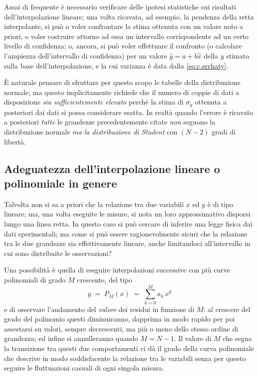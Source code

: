Assai di frequente \`e necessario verificare delle ipotesi
statistiche sui risultati dell'interpolazione lineare; una
volta ricavata, ad esempio, la pendenza della retta
interpolante, si pu\`o o voler confrontare la stima ottenuta
con un valore noto a priori, o voler costruire attorno ad
essa un intervallo corrispondente ad un certo livello di
confidenza; o, ancora, si pu\`o voler effettuare il
confronto (o calcolare l'ampiezza dell'intervallo di
confidenza) per un valore $\widehat y = a + b \widehat x$
della $y$ stimato sulla base dell'interpolazione, e la cui
varianza \`e data dalla \eqref{eq:c.errhaty}.

\`E naturale pensare di sfruttare per questo scopo le
tabelle della distribuzione normale; ma questo
implicitamente richiede che il numero di coppie di dati a
disposizione \emph{sia sufficientemente elevato} perch\'e la
stima di $\sigma_y$ ottenuta a posteriori dai dati si possa
considerare esatta.  In realt\`a quando l'errore \`e
ricavato a posteriori \emph{tutte} le grandezze
precedentemente citate \emph{non} seguono la distribuzione
normale \emph{ma la distribuzione di Student}%
con $(N-2)$ gradi di libert\`a.

\subsection{Adeguatezza dell'interpolazione lineare o
  polinomiale in genere}
Talvolta non si sa a priori che la relazione tra due
variabili $x$ ed $y$ \`e di tipo lineare; ma, una volta
eseguite le misure, si nota un loro approssimativo disporsi
lungo una linea retta.  In questo caso si pu\`o cercare di
inferire una legge fisica dai dati sperimentali; ma come si
pu\`o essere ragionevolmente sicuri che la relazione tra le
due grandezze sia effettivamente lineare, anche limitandoci
all'intervallo in cui sono distribuite le osservazioni?

Una possibilit\`a \`e quella di eseguire interpolazioni
successive con pi\`u curve polinomiali di grado $M$
crescente, del tipo
\begin{equation} \label{eq:c.polin}
  y \; = \; P_M(x) \; = \; \sum_{k=0}^M a_k \, x^k
\end{equation}
e di osservare l'andamento del \emph{valore} dei residui in
funzione di $M$: al crescere del grado del polinomio questi
diminuiranno, dapprima in modo rapido per poi assestarsi su
valori, sempre decrescenti, ma pi\`u o meno dello stesso
ordine di grandezza; ed infine si annulleranno quando $M =
N-1$.  Il valore di $M$ che segna la transizione tra questi
due comportamenti ci d\`a il grado della curva polinomiale
che descrive in modo soddisfacente la relazione tra le
variabili senza per questo seguire le fluttuazioni casuali
di ogni singola misura.

